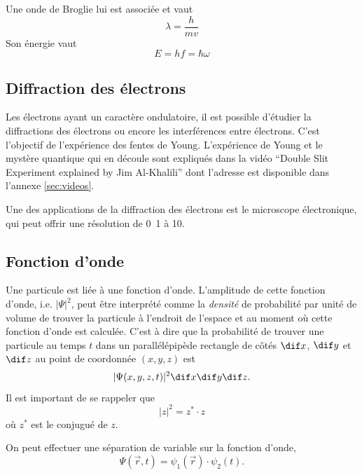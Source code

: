 Une onde de Broglie lui est associée et vaut
\[ \lambda = \frac{h}{mv} \]
Son énergie vaut
\[ E = hf = \hbar \omega \]

\subsection{Diffraction des électrons}
Les électrons ayant un caractère ondulatoire, il
est possible d'étudier la diffractions des électrons
ou encore les interférences entre électrons. C'est l'objectif
de l'expérience des fentes de Young. L'expérience de
Young et le mystère quantique qui en découle sont
expliqués dans la vidéo ``Double Slit Experiment explained
by Jim Al-Khalili'' dont l'adresse est disponible dans
l'annexe \ref{sec:videos}.

Une des applications de la diffraction des électrons est
le microscope électronique, qui peut offrir une résolution
de \unit{0.1}{\nano\meter} à \unit{10}{\nano\meter}.

\subsection{Fonction d'onde}
Une particule est liée à une fonction d'onde.
L'amplitude de cette fonction d'onde, i.e. $|\Psi|^2$, peut être interprété
comme la \emph{densité} de probabilité par unité de volume de trouver
la particule à l'endroit de l'espace et au moment où cette fonction
d'onde est calculée.
C'est à dire que la probabilité de trouver une particule
au temps $t$ dans un parallélépipède rectangle de côtés
$\dif x$, $\dif y$ et $\dif z$ au point de coordonnée $(x, y, z)$ est
\[ |\Psi(x, y, z, t)|^2 \dif x \dif y \dif z .\]
Il est important de se rappeler que
\[ |z|^2 = z^{*} \cdot z \]
où $z^{*}$ est le conjugué de $z$.

On peut effectuer une séparation de variable sur la fonction d'onde,
\[ \Psi(\vec{r}, t) = \psi_1(\vec{r}) \cdot \psi_2(t). \]

